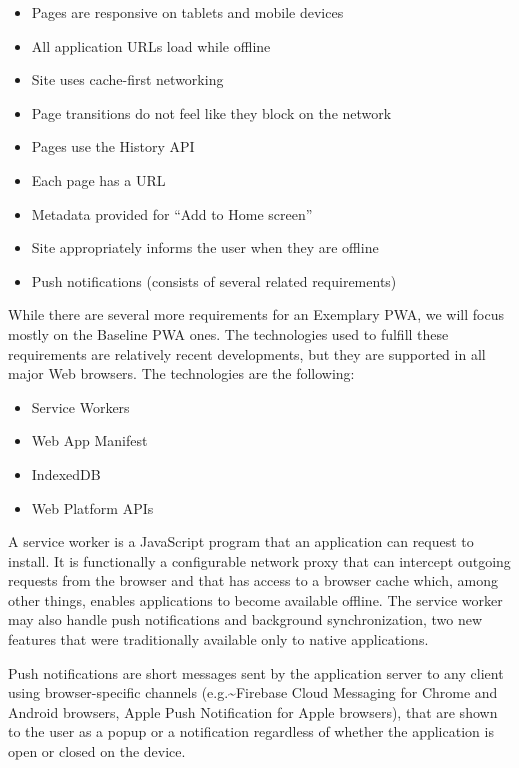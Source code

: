 \documentclass[english,odsaz]{fitthesis}
\begin{document}
\begin{itemize}
\item Pages are responsive on tablets and mobile devices
\item All application URLs load while offline
\item Site uses cache-first networking
\item Page transitions do not feel like they block on the network
\item Pages use the History API
\item Each page has a URL
\item Metadata provided for ``Add to Home screen''
\item Site appropriately informs the user when they are offline
\item Push notifications (consists of several related requirements)
\end{itemize}

While there are several more requirements for an Exemplary PWA, we will focus
mostly on the Baseline PWA ones. The technologies used to fulfill these
requirements are relatively recent developments, but they are supported in all
major Web browsers. The technologies are the following:

\begin{itemize}
\item Service Workers
\item Web App Manifest
\item IndexedDB
\item Web Platform APIs
\end{itemize}

A service worker is a JavaScript program that an application can request to
install. It is functionally a configurable network proxy \cite{mdn_svcwrk} that can
intercept outgoing requests from the browser and that has access to a browser
cache which, among other things, enables applications to become available
offline. The service worker may also handle push notifications and background
synchronization, two new features that were traditionally available only to
native applications.

Push notifications are short messages sent by the application server to any
client using browser-specific channels (e.g.\textasciitilde{}Firebase Cloud Messaging for Chrome
and Android browsers, Apple Push Notification for Apple browsers), that are
shown to the user as a popup or a notification regardless of whether the
application is open or closed on the device.
\end{document}
